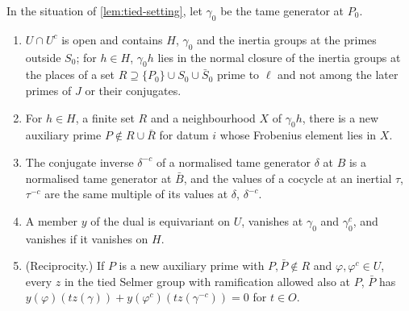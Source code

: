 \begin{lemma}\label{lem:mirror}
In the situation of \cref{lem:tied-setting}, let $\gamma_0$ be the tame generator at $P_0$.
\begin{enumerate}[label=\textup{(\alph*)}]
\item $U\cap U^c$ is open and contains $H$, $\gamma_0$ and the inertia groups at the primes outside $S_0$; for $h\in H$, $\gamma_0h$ lies in the normal closure of the inertia groups at the places of a set $R\supseteq\{P_0\}\cup S_0\cup\bar S_0$ prime to $\ell$ and not among the later primes of $J$ or their conjugates.
\item For $h\in H$, a finite set $R$ and a neighbourhood $X$ of $\gamma_0h$, there is a new auxiliary prime $P\notin R\cup\bar R$ for datum $i$ whose Frobenius element lies in $X$.
\item The conjugate inverse $\delta^{-c}$ of a normalised tame generator $\delta$ at $B$ is a normalised tame generator at $\bar B$, and the values of a cocycle at an inertial $\tau$, $\tau^{-c}$ are the same multiple of its values at $\delta$, $\delta^{-c}$.
\item A member $y$ of the dual is equivariant on $U$, vanishes at $\gamma_0$ and $\gamma_0^c$, and vanishes if it vanishes on $H$.
\item (Reciprocity.) If $P$ is a new auxiliary prime with $P,\bar P\notin R$ and $\varphi,\varphi^c\in U$, every $z$ in the tied Selmer group with ramification allowed also at $P$, $\bar P$ has $y(\varphi)(tz(\gamma))+y(\varphi^c)(tz(\gamma^{-c}))=0$ for $t\in O$.
\end{enumerate}
\end{lemma}

